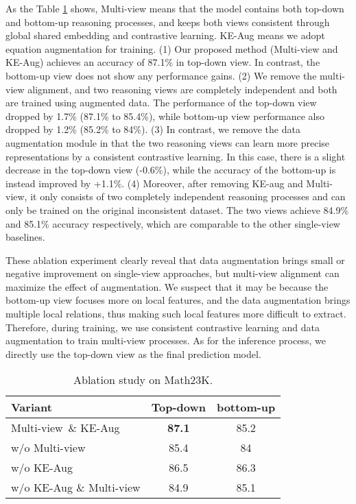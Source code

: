 \documentclass[11pt]{article}
\begin{document}
As the Table \ref{ablation_table} shows, Multi-view means that the model contains both top-down and bottom-up reasoning processes, and keeps both views consistent through global shared embedding and contrastive learning. KE-Aug means we adopt 
equation augmentation for training. (1) Our proposed method (Multi-view and KE-Aug) achieves an accuracy of 87.1\% in top-down view. In contrast, the bottom-up view does not show any performance gains. (2) We remove the multi-view alignment, and two reasoning views are completely independent and both are trained using augmented data. The performance of the top-down view dropped by 1.7\% (87.1\% to 85.4\%), while bottom-up view performance also dropped by 1.2\% (85.2\% to 84\%). (3) In contrast, we remove the data augmentation module in that the two reasoning views can learn more precise representations by a consistent contrastive learning. In this case, there is a slight decrease in the top-down view (-0.6\%), while the accuracy of the bottom-up is instead improved by +1.1\%. (4) Moreover, after removing KE-aug and Multi-view, it only consists of two completely independent reasoning processes and can only be trained on the original inconsistent dataset. The two views achieve 84.9\% and 85.1\% accuracy respectively, which are comparable to the other single-view baselines. 

These ablation experiment clearly reveal that data augmentation brings small or negative improvement on single-view approaches, but multi-view alignment can maximize the effect of augmentation. We suspect that it may be because the bottom-up view focuses more on local features, and the data augmentation brings multiple local relations, thus making such local features more difficult to extract. Therefore, during training, we use consistent contrastive learning and data augmentation to train multi-view processes. As for the inference process, we directly use the top-down view as the final prediction model.
\begin{table}[t]\small
\renewcommand\arraystretch{1.15}
\centering
\setlength\tabcolsep{2pt}\begin{tabular}{l c c}
\toprule
     \textbf{Variant} & \textbf{Top-down} & \textbf{bottom-up}\\
\midrule[0.25pt]
                         Multi-view\ \& KE-Aug            &\textbf{87.1} &85.2       \\ 
w/o Multi-view                      &85.4   &84  \\
w/o KE-Aug                      &86.5   &86.3  \\
w/o KE-Aug \& Multi-view   &84.9   &85.1 \\

\bottomrule
\end{tabular}
\caption{Ablation study on Math23K.}
\label{ablation_table}
\end{table}
\end{document}

